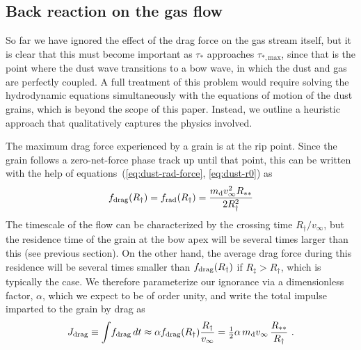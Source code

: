 \subsection{Back reaction on the gas flow}
\label{sec:back-reaction-gas}

So far we have ignored the effect of the drag force on the gas stream
itself, but it is clear that this must become important as \(\tau_*\)
approaches \(\tau_{*,\text{max}}\), since that is the point where the
dust wave transitions to a bow wave, in which the dust and gas are
perfectly coupled.  A full treatment of this problem would require
solving the hydrodynamic equations simultaneously with the equations
of motion of the dust grains, which is beyond the scope of this paper.
Instead, we outline a heuristic approach that qualitatively captures
the physics involved.

The maximum drag force experienced by a grain is at the rip point.
Since the grain follows a zero-net-force phase track up until that
point, this can be written with the help of
equations~(\ref{eq:dust-rad-force}, \ref{eq:dust-r0}) as
\begin{equation}
  \label{eq:fdrag-max}
  f_{\text{drag}} (R_\dag) = f_{\text{rad}}(R_\dag) =   \frac{m_{\text{d}} v_\infty^2 R_{**}}{ 2 R_\dag^2} 
\end{equation}
The timescale of the flow can be characterized by the crossing time
\(R_\dag / v_\infty\), but the residence time of the grain at the bow apex
will be several times larger than this (see previous section).  On the
other hand, the average drag force during this residence will be
several times smaller than \(f_{\text{drag}} (R_\dag)\) if
\(R_\ddag > R_\dag\), which is typically the case.  We therefore parameterize
our ignorance via a dimensionless factor, \(\alpha\), which we expect to be
of order unity, and write the total impulse imparted to the grain by
drag as
\begin{equation}
  \label{eq:grain-impulse}
  J\drag \equiv \int \!f\drag \, dt \approx \alpha f\drag (R_\dag) \frac{R_\dag}{v_\infty}
  = \tfrac12 \alpha \, m\grain v_\infty \, \frac{R\starstar}{R_\dag} \ .
\end{equation}

